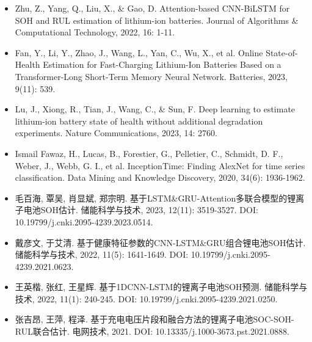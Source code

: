 \documentclass[12pt, a4paper]{ctexart}
\begin{document}
\begin{itemize}
  \item Zhu, Z., Yang, Q., Liu, X., \& Gao, D. Attention-based CNN-BiLSTM for SOH and RUL estimation of lithium-ion batteries. Journal of Algorithms \& Computational Technology, 2022, 16: 1-11.
\end{itemize}
\begin{itemize}
  \item Fan, Y., Li, Y., Zhao, J., Wang, L., Yan, C., Wu, X., et al. Online State-of-Health Estimation for Fast-Charging Lithium-Ion Batteries Based on a Transformer-Long Short-Term Memory Neural Network. Batteries, 2023, 9(11): 539.
\end{itemize}
\begin{itemize}
  \item  Lu, J., Xiong, R., Tian, J., Wang, C., \& Sun, F. Deep learning to estimate lithium-ion battery state of health without additional degradation experiments. Nature Communications, 2023, 14: 2760.
\end{itemize}
\begin{itemize}
  \item  Ismail Fawaz, H., Lucas, B., Forestier, G., Pelletier, C., Schmidt, D. F., Weber, J., Webb, G. I., et al. InceptionTime: Finding AlexNet for time series classification. Data Mining and Knowledge Discovery, 2020, 34(6): 1936-1962.
\end{itemize}
\begin{itemize}
  \item  毛百海, 覃吴, 肖显斌, 郑宗明. 基于LSTM\&GRU-Attention多联合模型的锂离子电池SOH估计. 储能科学与技术, 2023, 12(11): 3519-3527. DOI: 10.19799/j.cnki.2095-4239.2023.0514.
\end{itemize}
\begin{itemize}
  \item  戴彦文, 于艾清. 基于健康特征参数的CNN-LSTM\&GRU组合锂电池SOH估计. 储能科学与技术, 2022, 11(5): 1641-1649. DOI: 10.19799/j.cnki.2095-4239.2021.0623.
\end{itemize}
\begin{itemize}
  \item  王英楷, 张红, 王星辉. 基于1DCNN-LSTM的锂离子电池SOH预测. 储能科学与技术, 2022, 11(1): 240-245. DOI: 10.19799/j.cnki.2095-4239.2021.0250.
\end{itemize}
\begin{itemize}
  \item  张吉昂, 王萍, 程泽. 基于充电电压片段和融合方法的锂离子电池SOC-SOH-RUL联合估计. 电网技术, 2021. DOI: 10.13335/j.1000-3673.pst.2021.0888.
\end{itemize}
\end{document}

